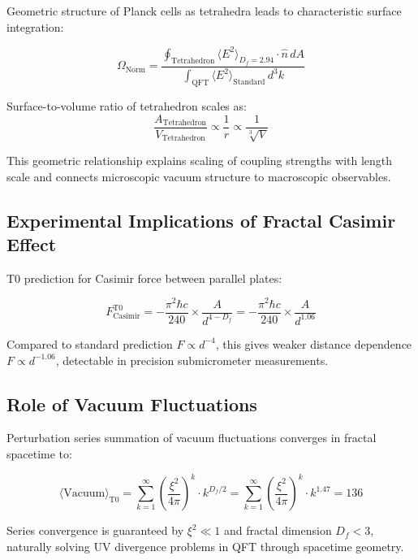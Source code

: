 \documentclass[12pt,a4paper]{article}
\theoremstyle{definition}
\begin{document}
	Geometric structure of Planck cells as tetrahedra leads to characteristic surface integration:
	
	\begin{equation}
		\Omega_{\text{Norm}} = \frac{\oint_{\text{Tetrahedron}} \langle E^2 \rangle_{D_f=2.94} \cdot \hat{n} \, dA}{\int_{\text{QFT}} \langle E^2 \rangle_{\text{Standard}} \, d^3k}
	\end{equation}
	
	Surface-to-volume ratio of tetrahedron scales as:
	\begin{equation}
		\frac{A_{\text{Tetrahedron}}}{V_{\text{Tetrahedron}}} \propto \frac{1}{r} \propto \frac{1}{\sqrt[3]{V}}
	\end{equation}
	
	This geometric relationship explains scaling of coupling strengths with length scale and connects microscopic vacuum structure to macroscopic observables.
	
	\subsection{Experimental Implications of Fractal Casimir Effect}
	
	T0 prediction for Casimir force between parallel plates:
	
	\begin{equation}
		F_{\text{Casimir}}^{\text{T0}} = -\frac{\pi^2 \hbar c}{240} \times \frac{A}{d^{4-D_f}} = -\frac{\pi^2 \hbar c}{240} \times \frac{A}{d^{1.06}}
	\end{equation}
	
	Compared to standard prediction $F \propto d^{-4}$, this gives weaker distance dependence $F \propto d^{-1.06}$, detectable in precision submicrometer measurements.
	
	\subsection{Role of Vacuum Fluctuations}
	
	Perturbation series summation of vacuum fluctuations converges in fractal spacetime to:
	
	\begin{equation}
		\langle \text{Vacuum} \rangle_{\text{T0}} = \sum_{k=1}^{\infty} \left(\frac{\xi^2}{4\pi}\right)^k \cdot k^{D_f/2} = \sum_{k=1}^{\infty} \left(\frac{\xi^2}{4\pi}\right)^k \cdot k^{1.47} = 136
	\end{equation}
	
	Series convergence is guaranteed by $\xi^2 \ll 1$ and fractal dimension $D_f < 3$, naturally solving UV divergence problems in QFT through spacetime geometry.
	
\end{document}
